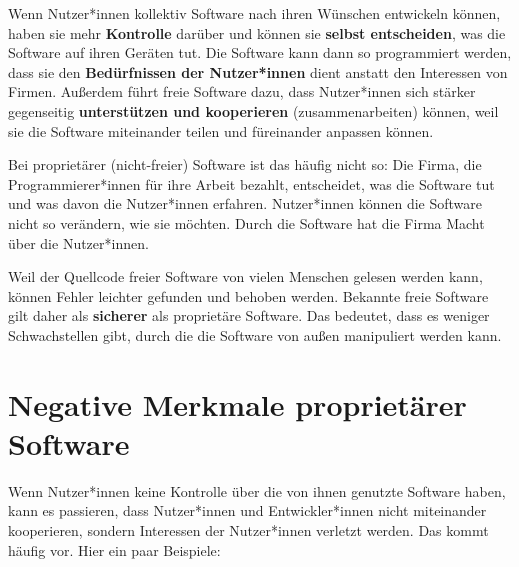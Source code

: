 \documentclass[a5paper,12pt]{scrartcl}
\begin{document}
Wenn Nutzer*innen kollektiv Software nach ihren Wünschen entwickeln
können, haben sie mehr \textbf{Kontrolle} darüber und können sie
\textbf{selbst entscheiden}, was die Software auf ihren Geräten
tut. Die Software kann dann so programmiert werden, dass sie den
\textbf{Bedürfnissen der Nutzer*innen} dient anstatt den Interessen
von Firmen. Außerdem führt freie Software dazu, dass Nutzer*innen sich
stärker gegenseitig \textbf{unterstützen und kooperieren}
(zusammenarbeiten) können, weil sie die Software miteinander teilen
und füreinander anpassen können.

Bei proprietärer (nicht-freier) Software ist das häufig nicht so: Die
Firma, die Programmierer*innen für ihre Arbeit bezahlt, entscheidet,
was die Software tut und was davon die Nutzer*innen
erfahren. Nutzer*innen können die Software nicht so verändern, wie sie
möchten. Durch die Software hat die Firma Macht über die
Nutzer*innen.

Weil der Quellcode freier Software von vielen Menschen gelesen werden
kann, können Fehler leichter gefunden und behoben werden. Bekannte
freie Software gilt daher als \textbf{sicherer} als proprietäre
Software. Das bedeutet, dass es weniger Schwachstellen gibt, durch die
die Software von außen manipuliert werden kann.


\section{Negative Merkmale proprietärer Software}

Wenn Nutzer*innen keine Kontrolle über die von ihnen genutzte Software
haben, kann es passieren, dass Nutzer*innen und Entwickler*innen nicht
miteinander kooperieren, sondern Interessen der Nutzer*innen verletzt
werden. Das kommt häufig vor. Hier ein paar Beispiele:
\end{document}
